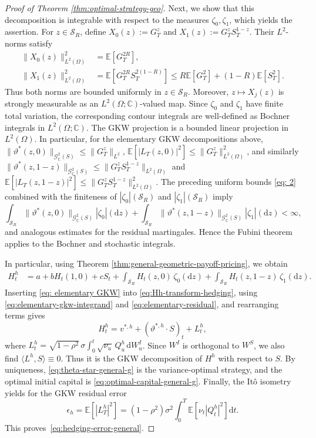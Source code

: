 \documentclass[10pt,a4paper,reqno]{amsart}
\theoremstyle{plain}
\theoremstyle{definition}
\theoremstyle{remark}
\theoremstyle{example}
\begin{document}
\begin{proof}[Proof of Theorem \ref{thm:optimal-strategy-geo}]
Next, we show that this decomposition is integrable with respect to the measures $\zeta_0, \zeta_1$, which yields the assertion. For $z\in\mathcal S_R$, define $X_0(z):=G_T^z$ and $X_1(z):=G_T^zS_T^{1-z}$. Their $L^2$-norms satisfy
\begin{align}\label{eq: 2}
    \|X_0(z)\|_{L^2(\Omega)}^2 &= \mathbb E[G_T^{2R}], \\
    \|X_1(z)\|_{L^2(\Omega)}^2
    &= \mathbb E[ G_T^{2R}S_T^{2(1-R)} ]
    \leq R\mathbb E[G_T^2] + (1-R)\mathbb E[S_T^2].
\end{align}
Thus both norms are bounded uniformly in $z\in\mathcal S_R$. Moreover, $z\mapsto X_j(z)$ is strongly measurable as an $L^2(\Omega;\mathbb C)$-valued map. Since $\zeta_0$ and $\zeta_1$ have finite total variation, the corresponding contour integrals are well-defined as Bochner integrals in $L^2(\Omega;\mathbb C)$. The GKW projection is a bounded linear projection in $L^2(\Omega)$. In particular, for the elementary GKW decompositions above, $\|\vartheta^*(z,0)\|_{\mathcal G^2_{\mathbb C}(S)} \leq \|G_T^z\|_{L^2}$, $\mathbb{E}[ |L_T(z,0)|^2]  \leq \|G_T^z\|_{L^2(\Omega)}^2$, and similarly $\|\vartheta^*(z,1-z)\|_{\mathcal G^2_{\mathbb C}(S)} \leq \|G_T^zS_T^{1-z}\|_{L^2(\Omega)}$ and $\mathbb{E}[ |L_T(z,1-z)|^2] \leq \|G_T^zS_T^{1-z}\|_{L^2(\Omega)}^2$. The preceding uniform bounds \eqref{eq: 2} combined with the finiteness of $|\zeta_0|(\mathcal S_R)$ and $|\zeta_1|(\mathcal S_R)$ imply
\[
    \int_{\mathcal S_R} \|\vartheta^*(z,0)\|_{\mathcal G^2_{\mathbb C}(S)} |\zeta_0|(\mathrm dz) + \int_{\mathcal S_R} \|\vartheta^*(z,1-z)\|_{\mathcal G^2_{\mathbb C}(S)} |\zeta_1|(\mathrm dz) < \infty,
\]
and analogous estimates for the residual martingales. Hence the Fubini theorem applies to the Bochner and stochastic integrals. 

In particular, using Theorem \ref{thm:general-geometric-payoff-pricing}, we obtain
\begin{align}\label{eq:Hh-transform-hedging}
    H_t^h &= a + bH_t(1,0) + cS_t + \int_{\mathcal S_R} H_t(z,0)\, \zeta_0(\mathrm dz) + \int_{\mathcal S_R} H_t(z,1-z)\, \zeta_1(\mathrm dz).
\end{align}
Inserting \eqref{eq: elementary GKW} into \eqref{eq:Hh-transform-hedging}, using \eqref{eq:elementary-gkw-integrand} and \eqref{eq:elementary-residual}, and rearranging terms gives 
\[
    H_t^h = v^{*,h} + (\vartheta^{*,h} \cdot S)_t + L_t^h,
\]
where $L_t^h = \sqrt{1-\rho^2}\,\sigma \int_0^t \sqrt{\nu_u}\, Q_u^h\, \mathrm dW_u^I$. Since $W^I$ is orthogonal to $W^S$, we also find $\langle L^h,S\rangle\equiv0$. Thus it is the GKW decomposition of $H^h$ with respect to $S$. By uniqueness, \eqref{eq:theta-star-general-g} is the variance-optimal strategy, and the optimal initial capital is \eqref{eq:optimal-capital-general-g}. Finally, the It\^o isometry yields for the GKW residual error
\[
    \epsilon_h = \mathbb E[|L_T^h|^2] = (1-\rho^2)\sigma^2 \int_0^T \mathbb E\left[ \nu_t |Q_t^h|^2 \right] \mathrm dt.
\]
This proves~\eqref{eq:hedging-error-general}.
\end{proof}
\end{document}
